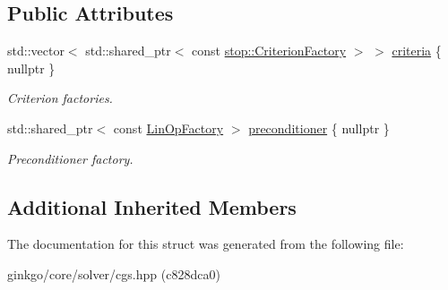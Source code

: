 \subsection*{Public Attributes}
\begin{DoxyCompactItemize}
\item 
\mbox{\label{structgko_1_1solver_1_1Cgs_1_1parameters__type_a02051dffae27205cd269beeaa29f8163}} 
std\+::vector$<$ std\+::shared\+\_\+ptr$<$ const \hyperlink{group__stop_gab12a51109c50b35ec36dc5a393d6a9a0}{stop\+::\+Criterion\+Factory} $>$ $>$ \hyperlink{structgko_1_1solver_1_1Cgs_1_1parameters__type_a02051dffae27205cd269beeaa29f8163}{criteria} \{ nullptr \}
\begin{DoxyCompactList}\small\item\em Criterion factories. \end{DoxyCompactList}\item 
\mbox{\label{structgko_1_1solver_1_1Cgs_1_1parameters__type_abbe93702c7bcb93bc1d831d6b947a0f9}} 
std\+::shared\+\_\+ptr$<$ const \hyperlink{classgko_1_1LinOpFactory}{Lin\+Op\+Factory} $>$ \hyperlink{structgko_1_1solver_1_1Cgs_1_1parameters__type_abbe93702c7bcb93bc1d831d6b947a0f9}{preconditioner} \{ nullptr \}
\begin{DoxyCompactList}\small\item\em Preconditioner factory. \end{DoxyCompactList}\end{DoxyCompactItemize}
\subsection*{Additional Inherited Members}


The documentation for this struct was generated from the following file\+:\begin{DoxyCompactItemize}
\item 
ginkgo/core/solver/cgs.\+hpp (c828dca0)\end{DoxyCompactItemize}
